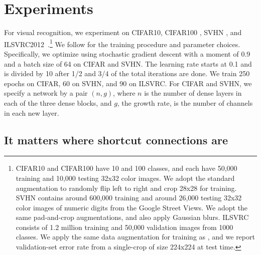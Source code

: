 \documentclass{article}
\newcommand{\logdense}{Log-DenseNet\xspace}
\begin{document}




\section{Experiments}
\label{sec:exp-logense-main}

For visual recognition, we experiment on CIFAR10, CIFAR100 \citep{cifar}, SVHN \citep{svhn}, and ILSVRC2012~\citep{ilsvrc}.\footnote{CIFAR10 and CIFAR100 have 10 and 100 classes, and each have 50,000 training and 10,000 testing 32x32 color images. We adopt the standard augmentation to randomly flip left to right and crop 28x28 for training. SVHN contains around 600,000 training and around 26,000 testing 32x32 color images of numeric digits from the Google Street Views. We adopt the same pad-and-crop augmentations, and also apply Gaussian blurs. ILSVRC consists of 1.2 million training and 50,000 validation images from 1000 classes. We apply the same data augmentation for training as \citep{resnet, densenet}, and we report validation-set error rate from a single-crop of size 224x224 at test time. }
We follow \citep{resnet, densenet} for the training procedure and parameter choices. Specifically, we optimize using stochastic gradient descent with a moment of 0.9 and a batch size of 64 on CIFAR and SVHN. The learning rate starts at 0.1 and is divided by 10 after 1/2 and 3/4 of the total iterations are done. We train 250 epochs on CIFAR, 60 on SVHN, and 90 on ILSVRC. For CIFAR and SVHN, we specify a network by a pair $(n,g)$, where $n$ is the number of dense layers in each of the three dense blocks, and $g$, the growth rate, is the number of channels in each new layer.


 

\subsection{It matters where shortcut connections are}

\end{document}
